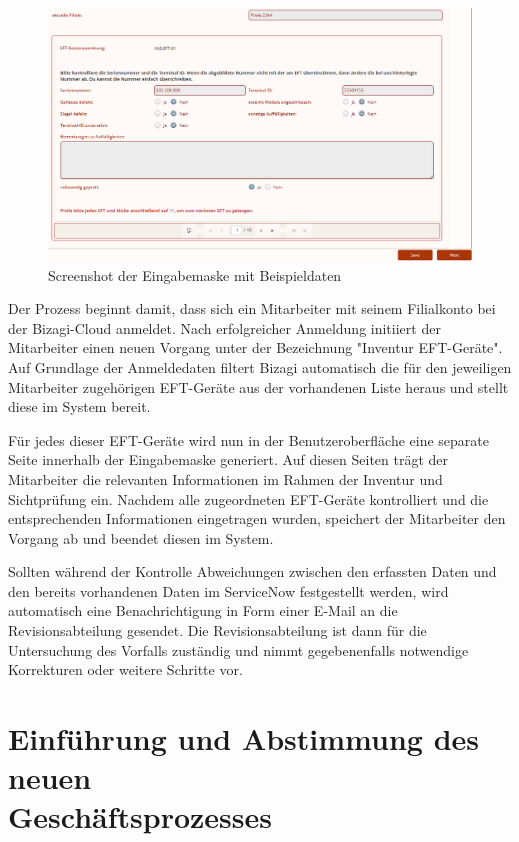 \documentclass[12pt, a4paper]{article}
\begin{document}
\begin{figure}[h]
    \centering
    \includegraphics[width=\textwidth]{images/eingabemaske.png}
    \caption{Screenshot der Eingabemaske mit Beispieldaten}
    \label{fig:maske}
\end{figure}

Der Prozess beginnt damit, dass sich ein Mitarbeiter mit seinem Filialkonto bei der Bizagi-Cloud anmeldet. Nach erfolgreicher Anmeldung initiiert der Mitarbeiter 
einen neuen Vorgang unter der Bezeichnung "Inventur EFT-Geräte". Auf Grundlage der Anmeldedaten filtert Bizagi automatisch die für den jeweiligen Mitarbeiter zugehörigen 
EFT-Geräte aus der vorhandenen Liste heraus und stellt diese im System bereit.

Für jedes dieser EFT-Geräte wird nun in der Benutzeroberfläche eine separate Seite innerhalb der Eingabemaske generiert. Auf diesen Seiten trägt der Mitarbeiter 
die relevanten Informationen im Rahmen der Inventur und Sichtprüfung ein. Nachdem alle zugeordneten EFT-Geräte kontrolliert und die entsprechenden Informationen eingetragen 
wurden, speichert der Mitarbeiter den Vorgang ab und beendet diesen im System.

Sollten während der Kontrolle Abweichungen zwischen den erfassten Daten und den bereits vorhandenen Daten im ServiceNow festgestellt werden, wird automatisch eine 
Benachrichtigung in Form einer E-Mail an die Revisionsabteilung gesendet. Die Revisionsabteilung ist dann für die Untersuchung des Vorfalls zuständig und nimmt gegebenenfalls 
notwendige Korrekturen oder weitere Schritte vor.

\section{Einführung und Abstimmung des neuen\\ Geschäftsprozesses}
\end{document}
